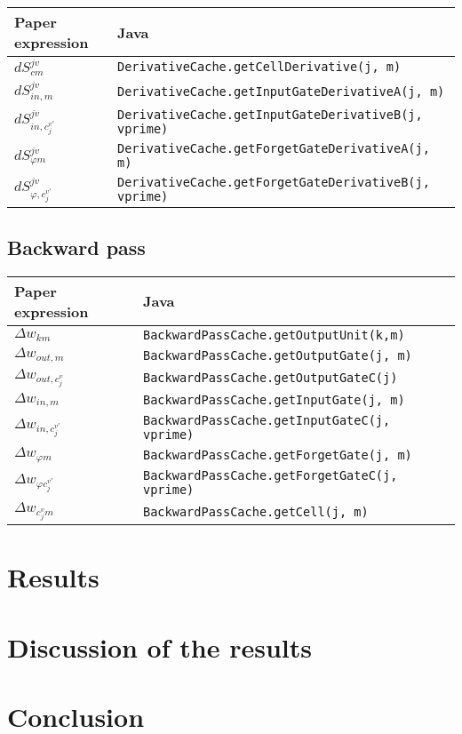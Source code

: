\documentclass[paper=A4, fontsize=11pt]{scrartcl} %
\begin{document}
\begin{center}
\begin{tabular}{|l|l|} 
	\hline
 	Paper expression & Java\\ 
 	\hline
	\hline
 		$dS_{cm}^{jv}$ & \verb!DerivativeCache.getCellDerivative(j, m)! \\ 
	\hline
 		$dS_{in,m}^{jv}$ & \verb!DerivativeCache.getInputGateDerivativeA(j, m)! \\ 
	\hline
  		$dS_{in,c_{j}^{v'}}^{jv}$ & \verb!DerivativeCache.getInputGateDerivativeB(j, vprime)! \\ 
	\hline
  		$dS_{\varphi m}^{jv}$ & \verb!DerivativeCache.getForgetGateDerivativeA(j, m)! \\ 
	\hline
  		$dS_{\varphi,c_{j}^{v'}}^{jv}$ & \verb!DerivativeCache.getForgetGateDerivativeB(j, vprime)! \\ 
	\hline
\end{tabular}
\end{center}

\subsection{Backward pass}
\begin{center}
\begin{tabular}{|l|l|} 
	\hline
 	Paper expression & Java\\ 
 	\hline
	\hline
 		$\Delta w_{km}$ & \verb!BackwardPassCache.getOutputUnit(k,m)! \\ 
 	\hline
 		$\Delta w_{out,m}$ & \verb!BackwardPassCache.getOutputGate(j, m)! \\ 
 	\hline
 		$\Delta w_{out, c_j^v}$ & \verb!BackwardPassCache.getOutputGateC(j)! \\ 
 	\hline
 		$\Delta w_{in,m}$ & \verb!BackwardPassCache.getInputGate(j, m)! \\
 	\hline
 		$\Delta w_{in, c_j^{v'}}$ & \verb!BackwardPassCache.getInputGateC(j, vprime)! \\
 	\hline
 		$\Delta w_{\varphi m}$ & \verb!BackwardPassCache.getForgetGate(j, m)! \\
 	\hline
 		$\Delta w_{\varphi c_j^{v'}}$ & \verb!BackwardPassCache.getForgetGateC(j, vprime)! \\
 	\hline
 		$\Delta w_{c_j^v m}$ & \verb!BackwardPassCache.getCell(j, m)! \\ 
	\hline
\end{tabular}
\end{center}





\newpage


\section{Results}

\newpage


\section{Discussion of the results}

\newpage


\section{Conclusion}
\end{document}
